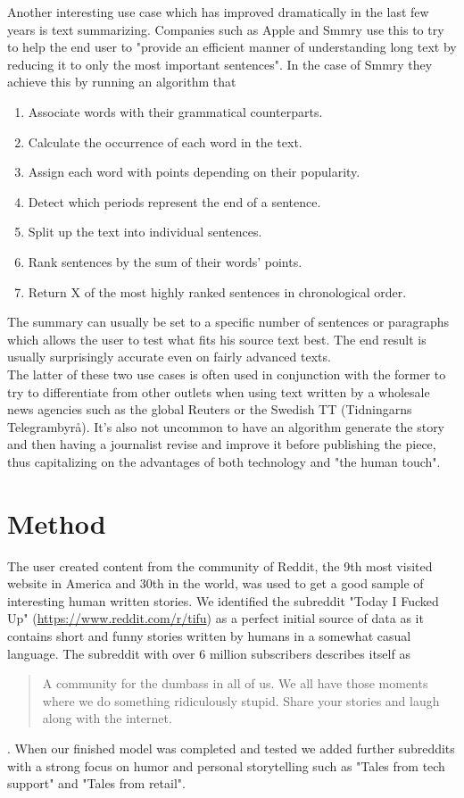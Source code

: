 \documentclass[12pt,a4paper,utf8]{article}
\begin{document}
Another interesting use case which has improved dramatically in the last few years is text summarizing. Companies such as Apple and Smmry use this to try to help the end user to "provide an efficient manner of understanding long text by reducing it to only the most important sentences"\autocite{Smmry}. In the case of Smmry they achieve this by running an algorithm that
\begin{enumerate}
\item Associate words with their grammatical counterparts.
\item Calculate the occurrence of each word in the text.
\item Assign each word with points depending on their popularity.
\item Detect which periods represent the end of a sentence.
\item Split up the text into individual sentences.
\item Rank sentences by the sum of their words' points.
\item Return X of the most highly ranked sentences in chronological order.
\end{enumerate}
The summary can usually be set to a specific number of sentences or paragraphs which allows the user to test what fits his source text best. The end result is usually surprisingly accurate even on fairly advanced texts.\\

The latter of these two use cases is often used in conjunction with the former to try to differentiate from other outlets when using text written by a wholesale news agencies such as the global Reuters or the Swedish TT (Tidningarns Telegrambyrå). It's also not uncommon to have an algorithm generate the story and then having a journalist revise and improve it before publishing the piece, thus capitalizing on the advantages of both technology and "the human touch"\autocite{RobotJournalist}.

\section{Method}\label{sec:method}
The user created content from the community of Reddit, the 9th most visited website in America and 30th in the world\autocite{alexa}, was used to get a good sample of interesting human written stories. We identified the subreddit "Today I Fucked Up" (\url{https://www.reddit.com/r/tifu}) as a perfect initial source of data as it contains short and funny stories written by humans in a somewhat casual language. The subreddit with over 6 million subscribers describes itself as \begin{quote}
A community for the dumbass in all of us. We all have those moments where we do something ridiculously stupid. Share your stories and laugh along with the internet\autocite{tifu}.
\end{quote}. When our finished model was completed and tested we added further subreddits with a strong focus on humor and personal storytelling such as "Tales from tech support" and "Tales from retail".
\end{document}
